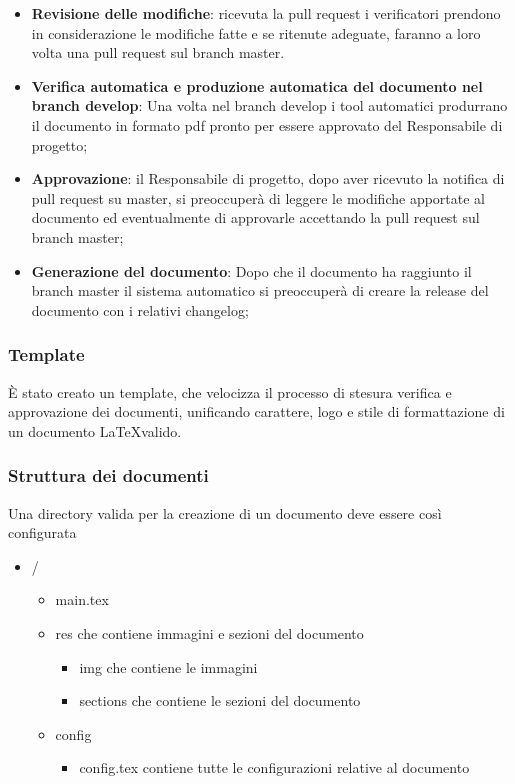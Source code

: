 \begin{itemize}
  \item \textbf{Revisione delle modifiche}: ricevuta la pull request i verificatori
  prendono in considerazione le modifiche fatte e se ritenute adeguate, faranno a
  loro volta una pull request sul branch master.

  \item \textbf{Verifica automatica e produzione automatica del documento nel
  branch develop}: Una volta nel branch develop i tool automatici produrrano il
  documento in formato pdf pronto per essere approvato del Responsabile di progetto;

  \item \textbf{Approvazione}: il Responsabile di progetto, dopo aver ricevuto la notifica
  di pull request su master, si preoccuper\`a di leggere le modifiche apportate al documento
  ed eventualmente di approvarle accettando la pull request sul branch master;

  \item \textbf{Generazione del documento}: Dopo che il documento ha raggiunto il
  branch master il sistema automatico si preoccuper\`a di creare la release del
  documento con i relativi changelog;
\end{itemize}

\subsubsection{Template}
\`E stato creato un template, che velocizza il processo di stesura verifica e
approvazione dei documenti, unificando carattere, logo e stile di formattazione
di un documento \LaTeX \space valido.

\subsubsection{Struttura dei documenti}
Una directory valida per la creazione di un documento deve essere così configurata
\begin{itemize}
  \item /
  \begin{itemize}
    \item main.tex
    \item res che contiene immagini e sezioni del documento
    \begin{itemize}
      \item img che contiene le immagini
      \item sections che contiene le sezioni del documento
    \end{itemize}
    \item config
    \begin{itemize}
      \item config.tex contiene tutte le configurazioni relative al documento
    \end{itemize}
  \end{itemize}
\end{itemize}
